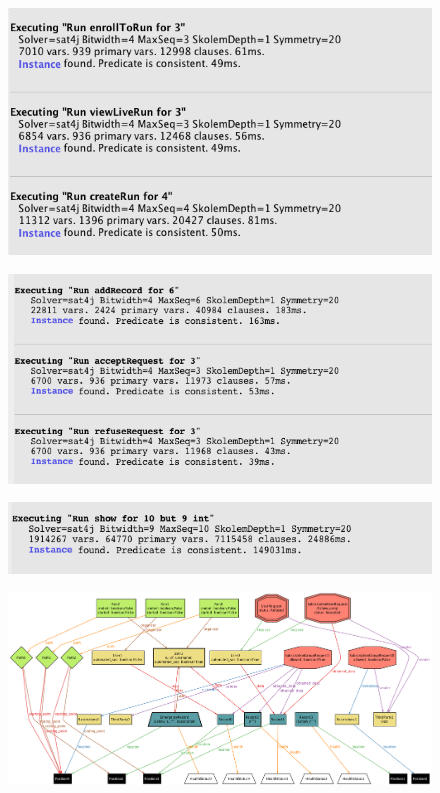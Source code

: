 \newpage
\begin{figure}[H]
    \centering
    \includegraphics[scale=0.6]{rasdL/Pictures/alloy/run1.png}
\end{figure}
\begin{figure}[H]
    \centering
    \includegraphics[scale=0.6]{rasdL/Pictures/alloy/run2.png}
\end{figure}
\begin{figure}[H]
    \centering
    \includegraphics[scale=0.6]{rasdL/Pictures/alloy/run3.png}
\end{figure}
\begin{figure}[H]
    \centering
    \includegraphics[angle=90, scale=0.4]{rasdL/Pictures/alloy/alloy-world.png}
\end{figure}
